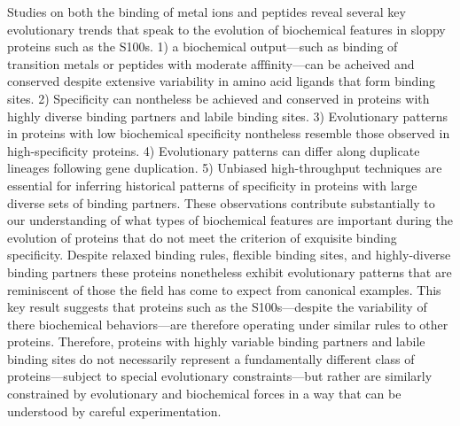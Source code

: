 Studies on both the binding of metal ions and peptides reveal several
key evolutionary trends that speak to the evolution of biochemical
features in sloppy proteins such as the S100s. 1) a biochemical output---such
as binding of transition metals or peptides with moderate afffinity---can
be acheived and conserved despite extensive variability in amino acid
ligands that form binding sites. 2) Specificity can nontheless be
achieved and conserved in proteins with highly diverse binding partners
and labile binding sites. 3) Evolutionary patterns in proteins with
low biochemical specificity nontheless resemble those observed in
high-specificity proteins. 4) Evolutionary patterns can differ along
duplicate lineages following gene duplication. 5) Unbiased high-throughput
techniques are essential for inferring historical patterns of specificity
in proteins with large diverse sets of binding partners. These observations
contribute substantially to our understanding of what types of biochemical
features are important during the evolution of proteins that do not
meet the criterion of exquisite binding specificity. Despite relaxed
binding rules, flexible binding sites, and highly-diverse binding
partners these proteins nonetheless exhibit evolutionary patterns
that are reminiscent of those the field has come to expect from canonical
examples. This key result suggests that proteins such as the S100s---despite
the variability of there biochemical behaviors---are therefore operating
under similar rules to other proteins. Therefore, proteins with highly
variable binding partners and labile binding sites do not necessarily
represent a fundamentally different class of proteins---subject to special
evolutionary constraints---but rather are similarly constrained by evolutionary
and biochemical forces in a way that can be understood by careful
experimentation.
